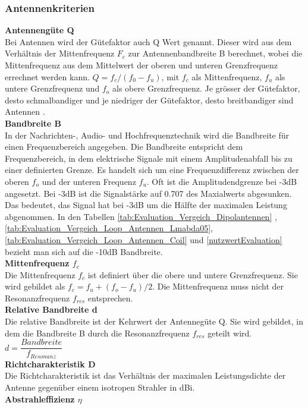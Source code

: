 \subsubsection{Antennenkriterien}
\textbf{Antennengüte Q}\\
Bei Antennen wird der Gütefaktor auch Q Wert genannt. Dieser wird aus dem Verhältnis der Mittenfrequenz $F_{c}$ zur Antennenbandbreite B berechnet, wobei die Mittenfrequenz aus dem Mittelwert der oberen und unteren Grenzfrequenz errechnet werden kann. $Q = f_c/(f_0-f_u)$, mit $f_c$ als Mittenfrequenz, $f_u$ als untere Grenzfrequenz und $f_o$ als obere Grenzfrequenz. Je grösser der Gütefaktor, desto schmalbandiger und je niedriger der Gütefaktor, desto breitbandiger sind Antennen \cite{Guetefaktor_Q}.\\
\textbf{Bandbreite B}\\
In der Nachrichten-, Audio- und Hochfrequenztechnik wird die Bandbreite für einen Frequenzbereich angegeben. Die Bandbreite entspricht dem Frequenzbereich, in dem elektrische Signale mit einem Amplitudenabfall bis zu einer definierten Grenze. Es handelt sich um eine Frequenzdifferenz zwischen der oberen $f_o$ und der unteren Frequenz $f_u$. Oft ist die Amplitudendgrenze bei -3dB angesetzt. Bei -3dB ist die Signalstärke auf 0.707 des Maxialwerts abgesunken. Das bedeutet, das Signal hat bei -3dB um die Hälfte der maximalen Leistung abgenommen\cite{Bandbreite_B}.
In den Tabellen \ref{tab:Evaluation_Vergeich_Dipolantennen} ,\ref{tab:Evaluation_Vergeich_Loop_Antennen_Lmabda05}, \ref{tab:Evaluation_Vergeich_Loop_Antennen_Coil} und \ref{nutzwertEvaluation} bezieht man sich auf die -10dB Bandbreite.\\
\textbf{Mittenfrequenz $f_{c}$}\\
Die Mittenfrequenz $f_c$ ist definiert über die obere und untere Grenzfrequenz. Sie wird gebildet als $f_c=f_u+(f_o-f_u)/2$. Die Mittenfrequenz muss nicht der Resonanzfrequenz $f_{res}$ entsprechen.\\
\textbf{Relative Bandbreite d}\\
Die relative Bandbreite ist der Kehrwert der Antennegüte Q.
Sie wird gebildet, in dem die Bandbreite B durch die Resonanzfrequenz $f_{res}$ geteilt wird. $d=\dfrac{Bandbreite}{f_{Resonanz}}$\\
\textbf{Richtcharakteristik D}\\
Die Richtcharakteristik ist das Verhältnis der maximalen Leistungsdichte der Antenne gegenüber einem isotropen Strahler in dBi.\\
\textbf{Abstrahleffizienz $\eta$}\\
